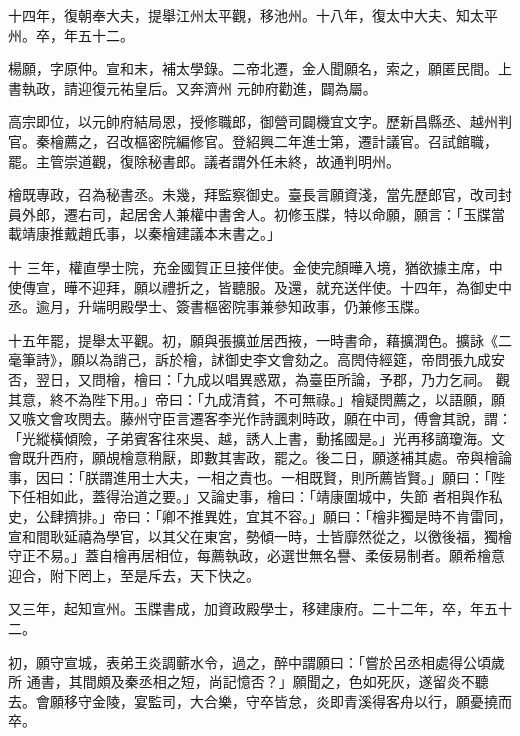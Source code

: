 \begin{pinyinscope}
 十四年，復朝奉大夫，提舉江州太平觀，移池州。十八年，復太中大夫、知太平州。卒，年五十二。



 楊願，字原仲。宣和末，補太學錄。二帝北遷，金人聞願名，索之，願匿民間。上書執政，請迎復元祐皇后。又奔濟州
 元帥府勸進，闢為屬。



 高宗即位，以元帥府結局恩，授修職郎，御營司闢機宜文字。歷新昌縣丞、越州判官。秦檜薦之，召改樞密院編修官。登紹興二年進士第，遷計議官。召試館職，罷。主管崇道觀，復除秘書郎。議者謂外任未終，故通判明州。



 檜既專政，召為秘書丞。未幾，拜監察御史。臺長言願資淺，當先歷郎官，改司封員外郎，遷右司，起居舍人兼權中書舍人。初修玉牒，特以命願，願言：「玉牒當載靖康推戴趙氏事，以秦檜建議本末書之。」



 十
 三年，權直學士院，充金國賀正旦接伴使。金使完顏曄入境，猶欲據主席，中使傳宣，曄不迎拜，願以禮折之，皆聽服。及還，就充送伴使。十四年，為御史中丞。逾月，升端明殿學士、簽書樞密院事兼參知政事，仍兼修玉牒。



 十五年罷，提舉太平觀。初，願與張擴並居西掖，一時書命，藉擴潤色。擴詠《二毫筆詩》，願以為誚己，訴於檜，訹御史李文會劾之。高閌侍經筵，帝問張九成安否，翌日，又問檜，檜曰：「九成以唱異惑眾，為臺臣所論，予郡，乃力乞祠。
 觀其意，終不為陛下用。」帝曰：「九成清貧，不可無祿。」檜疑閌薦之，以語願，願又嗾文會攻閌去。藤州守臣言遷客李光作詩諷刺時政，願在中司，傅會其說，謂：「光縱橫傾險，子弟賓客往來吳、越，誘人上書，動搖國是。」光再移謫瓊海。文會既升西府，願覘檜意稍厭，即數其害政，罷之。後二日，願遂補其處。帝與檜論事，因曰：「朕謂進用士大夫，一相之責也。一相既賢，則所薦皆賢。」願曰：「陛下任相如此，蓋得治道之要。」又論史事，檜曰：「靖康圍城中，失節
 者相與作私史，公肆擠排。」帝曰：「卿不推異姓，宜其不容。」願曰：「檜非獨是時不肯雷同，宣和間耿延禧為學官，以其父在東宮，勢傾一時，士皆靡然從之，以徼後福，獨檜守正不易。」蓋自檜再居相位，每薦執政，必選世無名譽、柔佞易制者。願希檜意迎合，附下罔上，至是斥去，天下快之。



 又三年，起知宣州。玉牒書成，加資政殿學士，移建康府。二十二年，卒，年五十二。



 初，願守宣城，表弟王炎調蘄水令，過之，醉中謂願曰：「嘗於呂丞相處得公頃歲所
 通書，其間頗及秦丞相之短，尚記憶否？」願聞之，色如死灰，遂留炎不聽去。會願移守金陵，宴監司，大合樂，守卒皆怠，炎即青溪得客舟以行，願憂撓而卒。




\end{pinyinscope}
